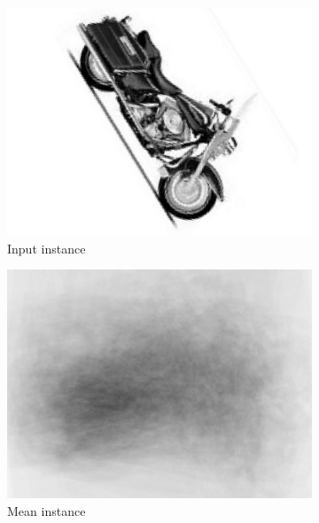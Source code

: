 \begin{figure}[ht]
\centering
\begin{subfigure}[b]{0.28\linewidth} \centering 
	\includegraphics[width=\linewidth]{fig/reg/onebike_before2.png}
	\caption{Input instance}
	\label{fig/reg/concept1}
\end{subfigure}
\begin{subfigure}[b]{0.28\linewidth} \centering 
	\includegraphics[width=\linewidth]{fig/reg/avgbike_before.png}
	\caption{Mean instance}
	\label{fig/reg/concept2}
\end{subfigure} \\ 
\begin{subfigure}[b]{0.28\linewidth} \centering

\end{subfigure}
\end{figure}
